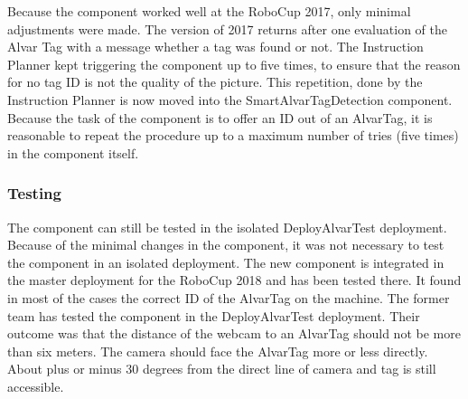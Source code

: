 Because the component worked well at the RoboCup 2017, only minimal adjustments were made. The version of 2017 returns after one evaluation of the Alvar Tag with a message whether a tag was found or not. The Instruction Planner kept triggering the component up to five times, to ensure that the reason for no tag ID is not the quality of the picture. 
This repetition, done by the Instruction Planner is now moved into the SmartAlvarTagDetection component. Because the task of the component is to offer an ID out of an AlvarTag, it is reasonable to repeat the procedure up to a maximum number of tries (five times) in the component itself.


\subsubsection{Testing}

The component can still be tested in the isolated DeployAlvarTest deployment. Because of the minimal changes in the component, it was not necessary to test the component in an isolated deployment. The new component is integrated in the master deployment for the RoboCup 2018 and has been tested there. It found in most of the cases the correct ID of the AlvarTag on the machine.
The former team has tested the component in the DeployAlvarTest deployment. Their outcome was that the distance of the webcam to an AlvarTag should not be more than six meters. 
The camera should face the AlvarTag more or less directly. About plus or minus 30 degrees from the direct line of camera and tag is still accessible.
